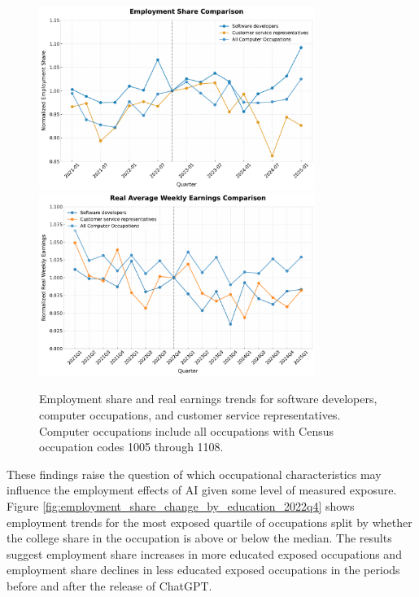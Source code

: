 \documentclass[12pt]{article}
\numberwithin{equation}{section}
\theoremstyle{theorem}\newcustomtheorem{theorem}{{\bf\sc Theorem}}
\theoremstyle{definition}\newcustomtheorem{assumption}{{\bf\sc Assumption}}
\theoremstyle{theorem} \newcustomtheorem{proposition}{{\bf\sc Proposition}}
\begin{document}
\begin{figure}[htbp]
	\centering
  \includegraphics[width=0.8\textwidth]{../figures/employment_share_comparison_2021Q1.pdf}
  \includegraphics[width=0.8\textwidth]{../figures/earnings_comparison_combined_2021Q1.pdf}
	\caption{Employment share and real earnings trends for software developers, computer occupations, and customer service representatives. Computer occupations include all occupations with Census occupation codes 1005 through 1108.}
	\label{fig:employment_share_comparison_2021Q1}
\end{figure}



These findings raise the question of which occupational characteristics may influence the employment effects of AI given some level of measured exposure. Figure \ref{fig:employment_share_change_by_education_2022q4} shows employment trends for the most exposed quartile of occupations split by whether the college share in the occupation is above or below the median. The results suggest employment share increases in more educated exposed occupations and employment share declines in less educated exposed occupations in the periods before and after the release of ChatGPT. 
\end{document}
